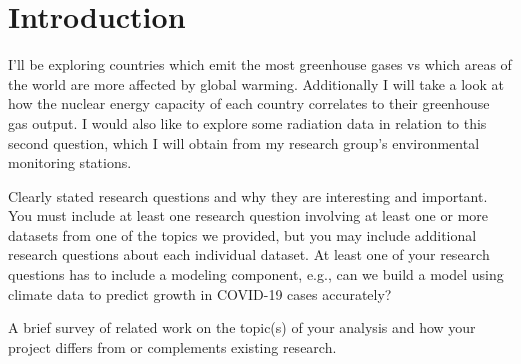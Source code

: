 \section{Introduction}
I'll be exploring countries which emit the most greenhouse gases vs which areas of the world are more affected by global warming. Additionally I will take a look at how the nuclear energy capacity of each country correlates to their greenhouse gas output. I would also like to explore some radiation data in relation to this second question, which I will obtain from my research group's environmental monitoring stations.

Clearly stated research questions and why they are interesting and important. You must include at least one research question involving at least one or more datasets from one of the topics we provided, but you may include additional research questions about each individual dataset. At least one of your research questions has to include a modeling component, e.g., can we build a model using climate data to predict growth in COVID-19 cases accurately?

A brief survey of related work on the topic(s) of your analysis and how your project differs from or complements existing research.